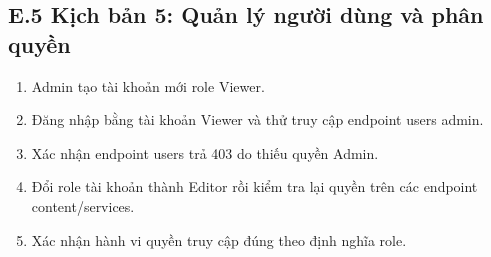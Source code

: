 \documentclass[12pt,a4paper]{article}
\begin{document}
\subsection*{E.5 Kịch bản 5: Quản lý người dùng và phân quyền}
\begin{enumerate}[leftmargin=1.1cm]
  \item Admin tạo tài khoản mới role Viewer.
  \item Đăng nhập bằng tài khoản Viewer và thử truy cập endpoint users admin.
  \item Xác nhận endpoint users trả 403 do thiếu quyền Admin.
  \item Đổi role tài khoản thành Editor rồi kiểm tra lại quyền trên các endpoint content/services.
  \item Xác nhận hành vi quyền truy cập đúng theo định nghĩa role.
\end{enumerate}
\end{document}
